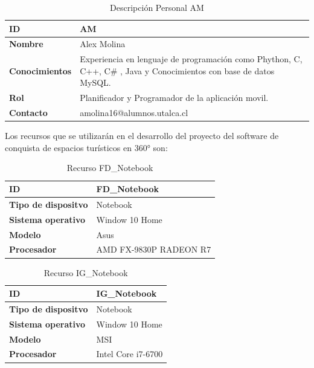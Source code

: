 \begin{table}[H]
    \centering
        \begin{tabular}{|l | p{12cm} |}        
        \hline
        \textbf{ID} & AM \\
        \hline
        \textbf{Nombre} & Alex Molina \\
        \hline
        \textbf{Conocimientos} & Experiencia en lenguaje de programación como Phython, C, C++, C\# , Java y Conocimientos con base de datos MySQL. \\
        \hline
        \textbf{Rol} & Planificador y Programador de la aplicación movil. \\    
        \hline
        \textbf{Contacto} & amolina16@alumnos.utalca.cl \\
        \hline            
        \end{tabular}
    \caption{Descripción Personal AM}
\end{table}

Los recursos que se utilizarán en el desarrollo del proyecto del software de conquista de espacios turísticos en 360° son:

\begin{table}[H]
    \centering
        \begin{tabular}{|l | p{12cm} |}        
        \hline
        \textbf{ID} & FD\_Notebook \\
        \hline
        \textbf{Tipo de dispositvo} & Notebook \\
        \hline
        \textbf{Sistema operativo} & Window 10 Home \\
        \hline
        \textbf{Modelo} & Asus \\
        \hline
        \textbf{Procesador} & AMD FX-9830P RADEON R7 \\    
        \hline            
        \end{tabular}
    \caption{Recurso FD\_Notebook}
\end{table}


\begin{table}[H]
    \centering
        \begin{tabular}{|l | p{12cm} |}        
        \hline
        \textbf{ID} & IG\_Notebook \\
        \hline
        \textbf{Tipo de dispositvo} & Notebook \\
        \hline
        \textbf{Sistema operativo} & Window 10 Home \\
        \hline
        \textbf{Modelo} & MSI \\
        \hline
        \textbf{Procesador} & Intel Core i7-6700 \\    
        \hline            
        \end{tabular}
    \caption{Recurso IG\_Notebook}
\end{table}

